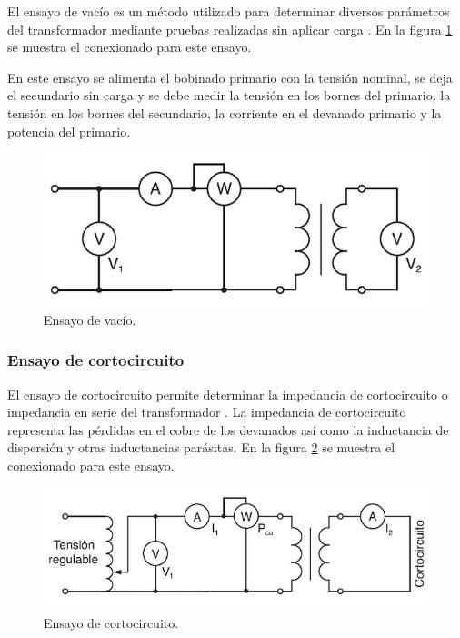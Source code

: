 El ensayo de vacío es un método utilizado para determinar diversos parámetros del transformador mediante pruebas realizadas sin aplicar carga \citep{TRAFO_VACIO}. En la figura \ref{fig:figEnsayoVacio} se muestra el conexionado para este ensayo.

En este ensayo se alimenta el bobinado primario con la tensión nominal, se deja el secundario sin carga y se debe medir la tensión en los bornes del primario, la tensión en los bornes del secundario, la corriente en el devanado primario y la potencia del primario. 

\begin{figure}[htpb]
	\centering
	\includegraphics[scale=.4]{./Figures/EnsayoVacio.png}
	\caption{Ensayo de vacío.}
	\label{fig:figEnsayoVacio}
\end{figure}

\subsubsection{Ensayo de cortocircuito}
El ensayo de cortocircuito permite determinar la impedancia de cortocircuito o impedancia en serie del transformador \citep{TRAFO_CORTO}. La impedancia de cortocircuito representa las pérdidas en el cobre de los devanados así como la inductancia de dispersión y otras inductancias parásitas. En la figura \ref{fig:figEnsayoCorto} se muestra el conexionado para este ensayo.

\begin{figure}[htpb]
	\centering
	\includegraphics[scale=.5]{./Figures/EnsayoCorto.png}
	\caption{Ensayo de cortocircuito.}
	\label{fig:figEnsayoCorto}
\end{figure}

